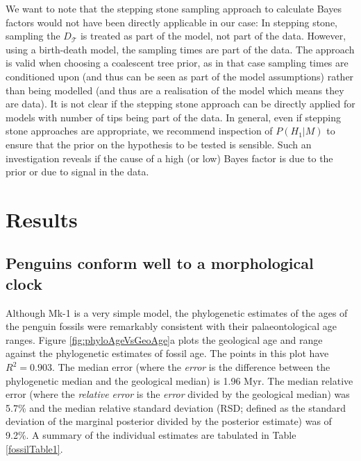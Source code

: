 \documentclass[11pt]{article}
\newcommand{\Mstrict}{{Mk-1}}
\begin{document}
We want to note that the stepping stone sampling approach \cite{Xie2011}
 to calculate Bayes factors would not have been directly applicable in our case:  In stepping stone, sampling the $D_\mathcal{T}$ is treated as part of the model, not part of the data. However, using a birth-death model, the sampling times are part of the data. The approach is valid when choosing a  coalescent tree prior, as in that case sampling times are conditioned upon (and thus can be seen as part of the model assumptions) rather than being modelled (and thus are a realisation of the model which means they are data). It is not clear if the stepping stone approach can be directly applied for models with number of tips being part of the data.
In general, even if stepping stone approaches are appropriate, we recommend inspection of $P(H_1|M)$ to ensure that the prior on the hypothesis to be tested is sensible. Such an investigation reveals if the cause of a high (or low) Bayes factor is due to the prior or due to signal in the data.


\section*{Results}

\subsection*{Penguins conform well to a morphological clock}
Although \Mstrict{} is a very simple model, the phylogenetic estimates of the ages of the penguin fossils were remarkably consistent with their palaeontological age ranges. 
Figure \ref{fig:phyloAgeVsGeoAge}a plots the geological age and range against the phylogenetic estimates of fossil age. The points in this plot have $R^2 = 0.903$. 
The median error (where the {\it error} is the difference between the phylogenetic median and the geological median) is 1.96 Myr. The median relative error (where the {\it relative error} is the {\it error} divided by the geological median) was 5.7\% and the median relative standard deviation (RSD; defined as the standard deviation of the marginal posterior divided by the posterior estimate) was of 9.2\%.
A summary of the individual estimates are tabulated in Table \ref{fossilTable1}.
\end{document}
